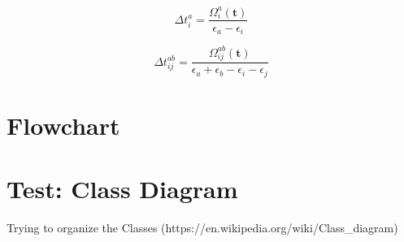 \begin{equation}
  \Delta t_i^a = \frac{\Omega_i^a(\mathbf{t})}{\epsilon_a - \epsilon_i}
\end{equation}

\begin{equation}
  \Delta t_{ij}^{ab} = \frac{\Omega_{ij}^{ab}(\mathbf{t})}
  {\epsilon_a + \epsilon_b - \epsilon_i - \epsilon_j}
\end{equation}



\newpage
\section{Flowchart}
\label{sec:ccsd_flowchart}



\newpage
\section{Test: Class Diagram}
Trying to organize the Classes (https://en.wikipedia.org/wiki/Class\_diagram)




